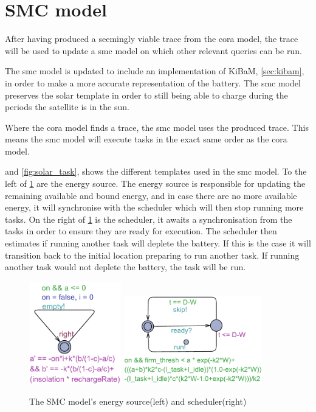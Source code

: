 \section{SMC model}
After having produced a seemingly viable trace from the \gls{cora} model, the trace will be used to update a \gls{smc} model on which other relevant queries can be run.

The \gls{smc} model is updated to include an implementation of KiBaM, \cref{sec:kibam}, in order to make a more accurate representation of the battery. The \gls{smc} model preserves the solar template in order to still being able to charge during the periods the satellite is in the sun.

Where the \gls{cora} model finds a trace, the \gls{smc} model uses the produced trace. This means the \gls{smc} model will execute tasks in the exact same order as the \gls{cora} model.%

 and \cref{fig:solar_task}, shows the different templates used in the \gls{smc} model. To the left of \cref{fig:cost_schedule} are the energy source. The energy source is responsible for updating the remaining available and bound energy, and in case there are no more available energy, it will synchronise with the scheduler which will then stop running more tasks.
On the right of \cref{fig:cost_schedule} is the scheduler, it awaits a synchronisation from the tasks in order to ensure they are ready for execution. The scheduler then estimates if running another task will deplete the battery. If this is the case it will transition back to the initial location preparing to run another task. If running another task would not deplete the battery, the task will be run.

\begin{figure}[H]%
	\centering
	\subfloat
	{{\includegraphics[width=4cm]{graphics/smc_costhandler.pdf} }}%
	\qquad
	\subfloat
	{{\includegraphics[width=6cm]{graphics/smc_scheduler.pdf} }}%
	\caption{The SMC model's energy source(left) and scheduler(right)}%
	\label{fig:cost_schedule}%
\end{figure}

